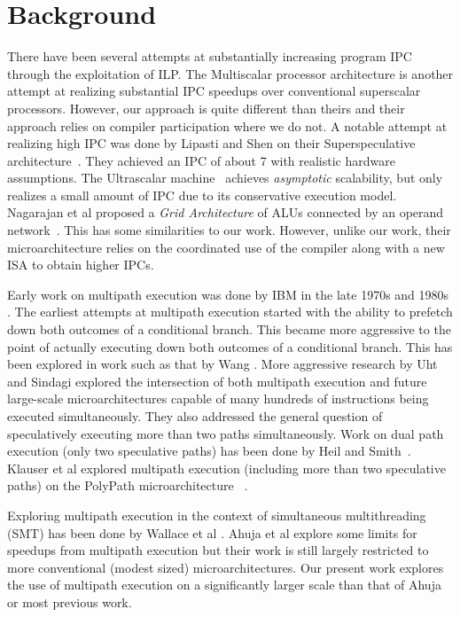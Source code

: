 \documentclass[10pt,twocolumn,dvips]{article}
\begin{document}
\section{Background}
%
There have been several attempts at substantially increasing
program IPC through the exploitation of ILP.
The Multiscalar processor architecture \cite{Soh95}
is another attempt at
realizing substantial IPC speedups over conventional superscalar
processors.  However, our approach is quite different than theirs
and their approach relies on compiler participation where we do not.
A notable attempt at realizing high IPC was done by
Lipasti and Shen on their Superspeculative
architecture~\cite{Lip97}.  They achieved an IPC of
about 7 with realistic hardware assumptions.
The Ultrascalar machine~\cite{Hen00}
achieves {\em asymptotic} scalability,
but only realizes a small amount of IPC due to its 
conservative execution model.
Nagarajan et al proposed a {\em Grid Architecture} of ALUs
connected by an operand network~\cite{Nag01}.  
This has some similarities to our work.
However, unlike our work, their microarchitecture
relies on the coordinated use of the compiler along with
a new ISA to obtain higher IPCs.

Early work on multipath execution was
done by IBM in the
late 1970s and 1980s \cite{Conners79}.
The earliest attempts at multipath
execution started with the ability to prefetch down both
outcomes of a conditional branch.  This became more aggressive
to the point of actually executing down both outcomes of
a conditional branch.  This has
been explored in work such as that by
Wang \cite{Wang90}.  
More aggressive research by Uht and
Sindagi \cite{Uht95} explored the intersection of both
multipath execution and future large-scale microarchitectures
capable of many hundreds of instructions being executed simultaneously.
They also addressed the general question of speculatively executing
more than two paths simultaneously.
Work on dual path execution (only two speculative paths) has
been done by Heil and Smith~\cite{Heil96}.
Klauser et al 
explored multipath execution (including more than two
speculative paths)
on the PolyPath microarchitecture ~\cite{Klauser98}.

Exploring multipath execution in the context of
simultaneous multithreading (SMT)
has been done by
Wallace et al \cite{Wallace98}.  
Ahuja et al \cite{Ahuja98} explore some limits for speedups from
multipath execution but their work is still largely restricted to more
conventional (modest sized) microarchitectures.
Our present work explores the use
of multipath execution on a significantly larger scale
than that of Ahuja or most previous work.
%
%
\end{document}
